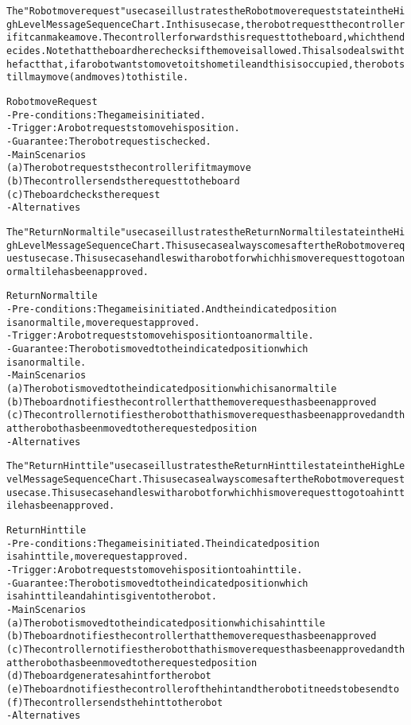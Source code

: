 \begin{alltt}
The "Robot move request" use case illustrates the Robot move request state in the High Level Message Sequence Chart. In this use case, the robot request the controller if it can make a move. The controller forwards this request to the board, which then decides. Note that the board here checks if the move is allowed. This also deals with the fact that, if a robot wants to move to its home tile and this is occupied, the robot still may move (and moves) to this tile.

Robot move Request
- Pre-conditions: The game is initiated.
- Trigger: A robot requests to move his position.
- Guarantee: The robot request is checked.
- Main Scenarios
    (a) The robot requests the controller if it may move
    (b) The controller sends the request to the board
    (c) The board checks the request
- Alternatives


The "Return Normal tile" use case illustrates the Return Normal tile state in the High Level Message Sequence Chart. This use case always comes after the Robot move request use case. This use case handles with a robot for which his move request to go to a normal tile has been approved.

Return Normal tile
- Pre-conditions: The game is initiated. And the indicated position
    is a normal tile, move request approved.
- Trigger: A robot requests to move his position to a normal tile.
- Guarantee: The robot is moved to the indicated position which
    is a normal tile.
- Main Scenarios
    (a) The robot is moved to the indicated position which is a normal tile
    (b) The board notifies the controller that the move request has been approved
    (c) The controller notifies the robot that his move request has been approved and that the robot has been moved to the requested position
- Alternatives

The "Return Hint tile" use case illustrates the Return Hint tile state in the High Level Message Sequence Chart. This use case always comes after the Robot move request use case. This use case handles with a robot for which his move request to go to a hint tile has been approved.

Return Hint tile
- Pre-conditions: The game is initiated. The indicated position
    is a hint tile, move request approved.
- Trigger: A robot requests to move his position to a hint tile.
- Guarantee: The robot is moved to the indicated position which
    is a hint tile and a hint is given to the robot.
- Main Scenarios
    (a) The robot is moved to the indicated position which is a hint tile
    (b) The board notifies the controller that the move request has been approved
    (c) The controller notifies the robot that his move request has been approved and that the robot has been moved to the requested position
    (d) The board generates a hint for the robot
    (e) The board notifies the controller of the hint and the robot it needs to be send to
    (f) The controller sends the hint to the robot
- Alternatives


\end{alltt}
